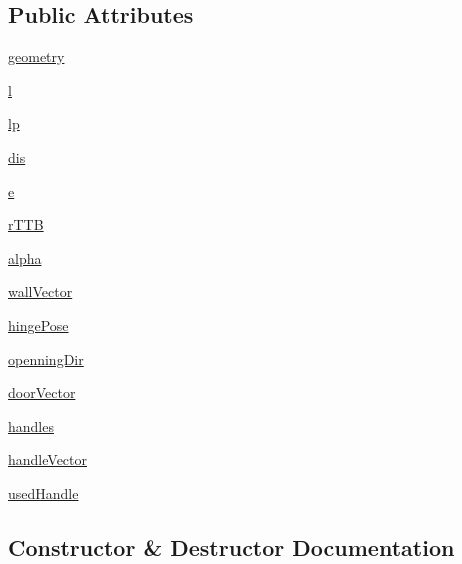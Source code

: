 \subsection*{Public Attributes}
\begin{DoxyCompactItemize}
\item 
\hyperlink{classcmd__TTB_1_1door_1_1Door_a212cc5247f91b1f69d35ae939c7ea34d}{geometry}
\item 
\hyperlink{classcmd__TTB_1_1door_1_1Door_a82aed36f492d477c488cca0e31c91845}{l}
\item 
\hyperlink{classcmd__TTB_1_1door_1_1Door_a5366be26d44de1cad62c4aacb66718b1}{lp}
\item 
\hyperlink{classcmd__TTB_1_1door_1_1Door_aab6a2a8e488dad5304b7ee73e9ca65a9}{dis}
\item 
\hyperlink{classcmd__TTB_1_1door_1_1Door_a7802efbefd3ee0f39ad7da87db6bde66}{e}
\item 
\hyperlink{classcmd__TTB_1_1door_1_1Door_aeebd5ef44f3ec44c230c157e295b3414}{r\+T\+TB}
\item 
\hyperlink{classcmd__TTB_1_1door_1_1Door_a43c4b1f6e9c6ae4187382dc263c58d02}{alpha}
\item 
\hyperlink{classcmd__TTB_1_1door_1_1Door_a067030e5b4755f2d2b4340588609901c}{wall\+Vector}
\item 
\hyperlink{classcmd__TTB_1_1door_1_1Door_a17ee5270094c8735cb4ae02968645fe2}{hinge\+Pose}
\item 
\hyperlink{classcmd__TTB_1_1door_1_1Door_ac11ebd7424dd4a074edcda4c0584e61d}{openning\+Dir}
\item 
\hyperlink{classcmd__TTB_1_1door_1_1Door_aa7ead51645db4e5159f27f69d5aebc54}{door\+Vector}
\item 
\hyperlink{classcmd__TTB_1_1door_1_1Door_abf377a198959472e644f81d28abeee5f}{handles}
\item 
\hyperlink{classcmd__TTB_1_1door_1_1Door_a1bddc9ba7dbbb7d9e73ba75f3b3a7287}{handle\+Vector}
\item 
\hyperlink{classcmd__TTB_1_1door_1_1Door_a711d46f8f16b8142ee76f4e512e90953}{used\+Handle}
\end{DoxyCompactItemize}


\subsection{Constructor \& Destructor Documentation}
